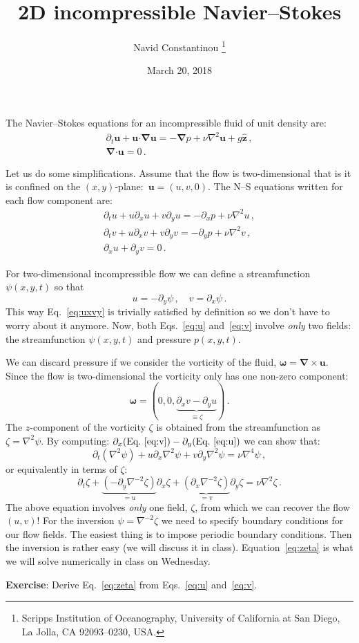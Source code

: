 \documentclass[11pt]{article}
\def\beq{\begin{equation}}
\def\eeq{\end{equation}}
\newcommand{\bu}{\boldsymbol{u}}
\providecommand\bnabla{\boldsymbol{\nabla}}
\providecommand\bcdot{\boldsymbol{\cdot}}
\newcommand{\com}{\, ,}
\newcommand{\per}{\, .}
\renewcommand{\(}{\left(}
\renewcommand{\[}{\left[}
\renewcommand{\)}{\right)}
\renewcommand{\]}{\right]}
\newcommand{\<}{\left\langle}
\renewcommand{\>}{\right\rangle}
\newcommand{\zhat}{\hat{\boldsymbol{z}}}
\begin{document}
\title{2D incompressible Navier--Stokes}

\author{
Navid Constantinou \thanks {Scripps Institution of Oceanography,
University of California at San Diego, La Jolla, CA
92093--0230, USA.
}
}

\date{March 20, 2018}

\maketitle

The Navier--Stokes equations for an incompressible fluid of unit density are:
\begin{gather}
\partial_t \bu + \bu\bcdot\bnabla\bu = -\bnabla p + \nu\nabla^2\bu + g\zhat \com\label{eq1}\\
\bnabla\bcdot\bu = 0 \per\label{eq2}
\end{gather}

Let us do some simplifications. Assume that the flow is two-dimensional that is it is confined on the $(x,y)$-plane:~$\bu=(u,v,0)$. The N--S equations written for each flow component are:
\begin{gather}
\partial_t u + u\partial_x u + v\partial_y u = -\partial_x p + \nu\nabla^2u \com\label{eq:u}\\
\partial_t v + u\partial_x v + v\partial_y v = -\partial_y p + \nu\nabla^2v \com\label{eq:v}\\
\partial_x u + \partial_y v = 0 \per\label{eq:uxvy}
\end{gather}

For two-dimensional incompressible flow we can define a streamfunction $\psi(x,y,t)$ so that
\beq
u = -\partial_y \psi\com\quad v= \partial_x\psi\per
\eeq
This way Eq.~\eqref{eq:uxvy} is trivially satisfied by definition so we don't have to worry about it anymore. Now, both Eqs.~\eqref{eq:u} and~\eqref{eq:v} involve {\it only} two fields: the streamfunction $\psi(x,y,t)$ and pressure $p(x,y,t)$.

We can discard pressure if we consider the vorticity of the fluid, $\boldsymbol{\omega} = \bnabla\times\bu$. Since the flow is two-dimensional the vorticity only has one non-zero component:
\beq
\boldsymbol{\omega} = (0, 0, \underbrace{\partial_x v - \partial_y u}_{\equiv \zeta})\per
\eeq
The $z$-component of the vorticity $\zeta$ is obtained from the streamfunction as $\zeta = \nabla^2\psi$. By computing: $\partial_x(\text{Eq.~\eqref{eq:v}}) - \partial_y(\text{Eq.~\eqref{eq:u}})$ we can show that:
\beq
\partial_t (\nabla^2\psi) + u\partial_x \nabla^2\psi + v\partial_y\nabla^2\psi = \nu\nabla^4\psi\com
\eeq
or equivalently in terms of $\zeta$:
\beq
\partial_t \zeta + \underbrace{(-\partial_y\nabla^{-2}\zeta)}_{=u} \partial_x \zeta + \underbrace{(\partial_x\nabla^{-2}\zeta)}_{=v}  \partial_y\zeta = \nu\nabla^2\zeta\per \label{eq:zeta}
\eeq
The above equation involves {\it only} one field, $\zeta$, from which we can recover the flow $(u, v)$! For the inversion $\psi=\nabla^{-2}\zeta$ we need to specify boundary conditions for our flow fields. The easiest thing is to impose periodic boundary conditions. Then the inversion is rather easy (we will discuss it in class). Equation~\eqref{eq:zeta} is what we will solve numerically in class on Wednesday.

\vspace{1em}

\noindent\textbf{Exercise}: Derive Eq.~\eqref{eq:zeta} from Eqs.~\eqref{eq:u} and~\eqref{eq:v}.
\end{document}
